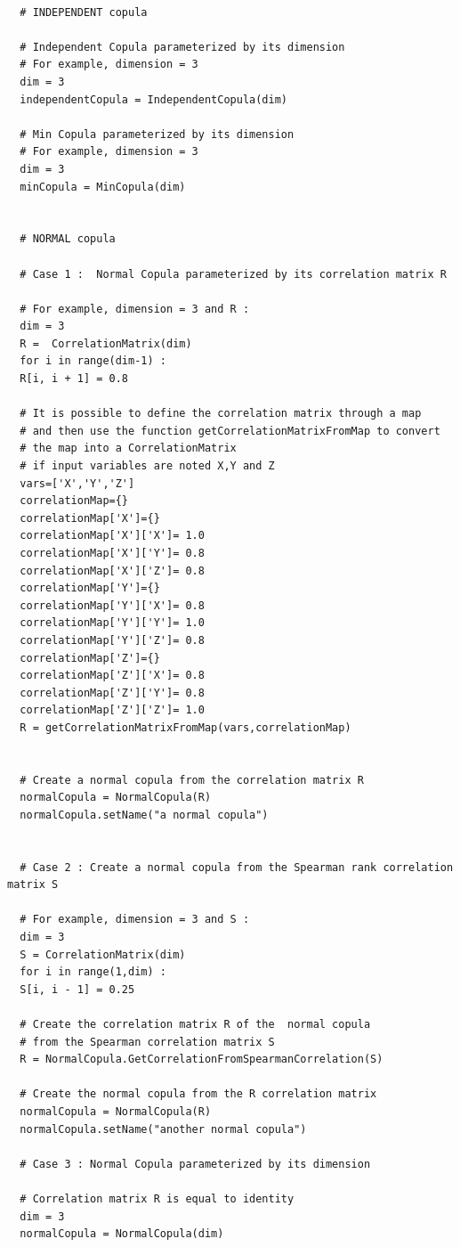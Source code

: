 \begin{lstlisting}

  # INDEPENDENT copula

  # Independent Copula parameterized by its dimension
  # For example, dimension = 3
  dim = 3
  independentCopula = IndependentCopula(dim)

  # Min Copula parameterized by its dimension
  # For example, dimension = 3
  dim = 3
  minCopula = MinCopula(dim)


  # NORMAL copula

  # Case 1 :  Normal Copula parameterized by its correlation matrix R

  # For example, dimension = 3 and R :
  dim = 3
  R =  CorrelationMatrix(dim)
  for i in range(dim-1) :
  R[i, i + 1] = 0.8

  # It is possible to define the correlation matrix through a map
  # and then use the function getCorrelationMatrixFromMap to convert
  # the map into a CorrelationMatrix
  # if input variables are noted X,Y and Z
  vars=['X','Y','Z']
  correlationMap={}
  correlationMap['X']={}
  correlationMap['X']['X']= 1.0
  correlationMap['X']['Y']= 0.8
  correlationMap['X']['Z']= 0.8
  correlationMap['Y']={}
  correlationMap['Y']['X']= 0.8
  correlationMap['Y']['Y']= 1.0
  correlationMap['Y']['Z']= 0.8
  correlationMap['Z']={}
  correlationMap['Z']['X']= 0.8
  correlationMap['Z']['Y']= 0.8
  correlationMap['Z']['Z']= 1.0
  R = getCorrelationMatrixFromMap(vars,correlationMap)


  # Create a normal copula from the correlation matrix R
  normalCopula = NormalCopula(R)
  normalCopula.setName("a normal copula")


  # Case 2 : Create a normal copula from the Spearman rank correlation matrix S

  # For example, dimension = 3 and S :
  dim = 3
  S = CorrelationMatrix(dim)
  for i in range(1,dim) :
  S[i, i - 1] = 0.25

  # Create the correlation matrix R of the  normal copula
  # from the Spearman correlation matrix S
  R = NormalCopula.GetCorrelationFromSpearmanCorrelation(S)

  # Create the normal copula from the R correlation matrix
  normalCopula = NormalCopula(R)
  normalCopula.setName("another normal copula")

  # Case 3 : Normal Copula parameterized by its dimension

  # Correlation matrix R is equal to identity
  dim = 3
  normalCopula = NormalCopula(dim)



\end{lstlisting}
